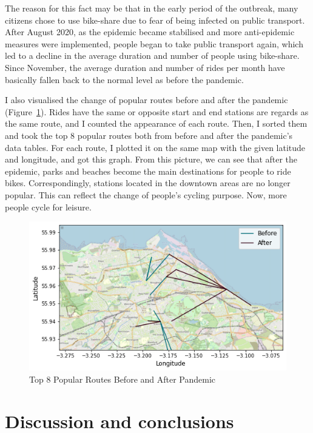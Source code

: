 \documentclass[11pt,a4paper]{article}
\begin{document}
The reason for this fact may be that in the early period of the outbreak, many citizens chose to use bike-share due to fear of being infected on public transport. After August 2020, as the epidemic became stabilised and more anti-epidemic measures were implemented, people began to take public transport again, which led to a decline in the average duration and number of people using bike-share. Since November, the average duration and number of rides per month have basically fallen back to the normal level as before the pandemic.

I also visualised the change of popular routes before and after the pandemic (Figure~\ref{fds-project-template:fig:mapFigure}). Rides have the same or opposite start and end stations are regards as the same route, and I counted the appearance of each route. Then, I sorted them and took the top 8 popular routes both from before and after the pandemic’s data tables. For each route, I plotted it on the same map with the given latitude and longitude, and got this graph. From this picture, we can see that after the epidemic, parks and beaches become the main destinations for people to ride bikes. Correspondingly, stations located in the downtown areas are no longer popular. This can reflect the change of people's cycling purpose. Now, more people cycle for leisure.

\begin{figure}[ht!]
  \centering
  \includegraphics[scale=0.85]{mapFigure.png}
  \caption{Top 8 Popular Routes Before and After Pandemic}
  \label{fds-project-template:fig:mapFigure}
\end{figure}

\section{Discussion and conclusions}
\end{document}
